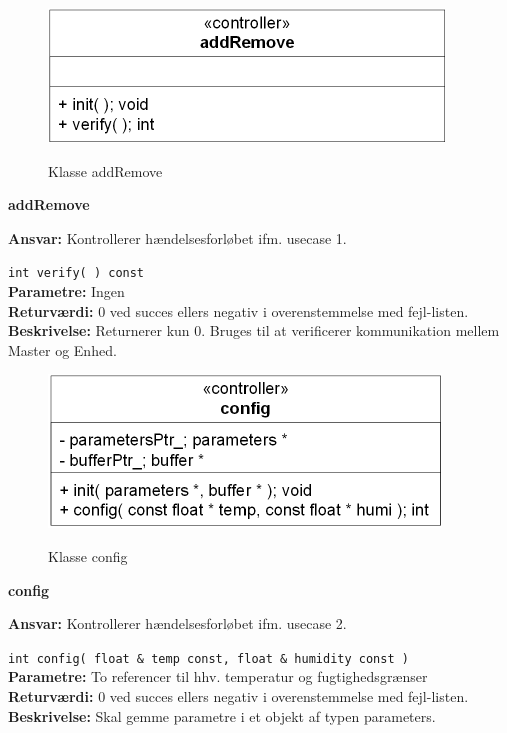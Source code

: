 
\begin{figure}[htbp] \centering
{\includegraphics[scale=1.3]{filer/design/Klassediagrammer/sw_psoc_addRemove}}
\caption{Klasse addRemove}
\label{fig:sw_psoc_class_addremove}
\end{figure} 

{\centering
\textbf{addRemove}\par
}
\textbf{Ansvar:} Kontrollerer hændelsesforløbet ifm. usecase 1. \

\verb+int verify( ) const +\\
\textbf{Parametre:} Ingen \\
\textbf{Returværdi:} 0 ved succes ellers negativ i overenstemmelse med fejl-listen. \\
\textbf{Beskrivelse:} Returnerer kun 0. Bruges til at verificerer kommunikation mellem Master og Enhed.\\

\begin{figure}[htbp] \centering
{\includegraphics[scale=1.3]{filer/design/Klassediagrammer/sw_psoc_config}}
\caption{Klasse config}
\label{fig:sw_psoc_class_config}
\end{figure} 

{\centering
\textbf{config}\par
}
\textbf{Ansvar:} Kontrollerer hændelsesforløbet ifm. usecase 2. \

\verb+int config( float & temp const, float & humidity const )+ \\
\textbf{Parametre:} To referencer til hhv. temperatur og fugtighedsgrænser \\
\textbf{Returværdi:} 0 ved succes ellers negativ i overenstemmelse med fejl-listen. \\
\textbf{Beskrivelse:} Skal gemme parametre i et objekt af typen parameters.\\

